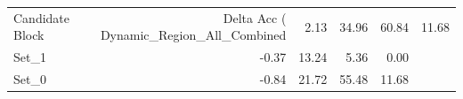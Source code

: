 \begin{tabular}{lrrrr}
\toprule
Candidate Block & Delta Acc (%
\midrule
Dynamic_Region_All_Combined & 2.13 & 34.96 & 60.84 & 11.68 \\
Set_1 & -0.37 & 13.24 & 5.36 & 0.00 \\
Set_0 & -0.84 & 21.72 & 55.48 & 11.68 \\
\bottomrule
\end{tabular}
